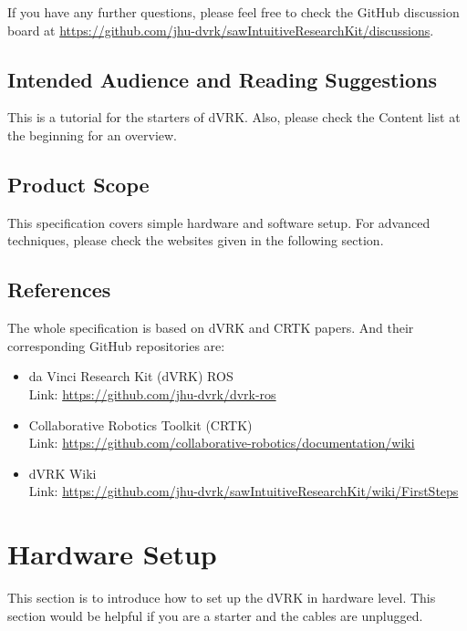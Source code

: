 If you have any further questions, please feel free to check the GitHub discussion board at \url{https://github.com/jhu-dvrk/sawIntuitiveResearchKit/discussions}.

\section{Intended Audience and Reading Suggestions}

This is a tutorial for the starters of dVRK. Also, please check the Content list at the beginning for an overview.

\section{Product Scope}

This specification covers simple hardware and software setup. For advanced techniques, please check the websites given in the following section.

\section{References}

The whole specification is based on dVRK\cite{kazanzides2014open} and CRTK\cite{su2020collaborative} papers. And their corresponding GitHub repositories are:

\begin{itemize}
    \item da Vinci Research Kit (dVRK) ROS \\ Link: \url{https://github.com/jhu-dvrk/dvrk-ros}
    \item Collaborative Robotics Toolkit (CRTK) \\ Link: \url{https://github.com/collaborative-robotics/documentation/wiki}
    \item dVRK Wiki \\ Link: \url{https://github.com/jhu-dvrk/sawIntuitiveResearchKit/wiki/FirstSteps}
\end{itemize}


\chapter{Hardware Setup}
\label{ch: hardware}

This section is to introduce how to set up the dVRK in hardware level. This section would be helpful if you are a starter and the cables are unplugged. 

